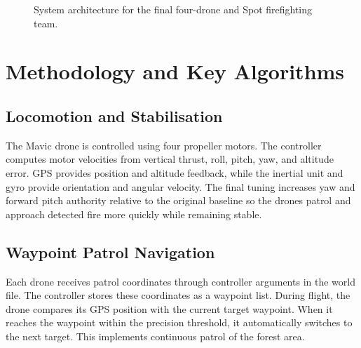 \documentclass[10pt,a4paper]{article}
\begin{document}
\begin{figure}[H]
{
}
\caption{System architecture for the final four-drone and Spot firefighting team.}
\end{figure}

\vspace{-0.6em}

\newpage
\section{Methodology and Key Algorithms}
\subsection{Locomotion and Stabilisation}
The Mavic drone is controlled using four propeller motors. The controller computes motor velocities from vertical thrust, roll, pitch, yaw, and altitude error. GPS provides position and altitude feedback, while the inertial unit and gyro provide orientation and angular velocity. The final tuning increases yaw and forward pitch authority relative to the original baseline so the drones patrol and approach detected fire more quickly while remaining stable.

\subsection{Waypoint Patrol Navigation}
Each drone receives patrol coordinates through controller arguments in the world file. The controller stores these coordinates as a waypoint list. During flight, the drone compares its GPS position with the current target waypoint. When it reaches the waypoint within the precision threshold, it automatically switches to the next target. This implements continuous patrol of the forest area.
\end{document}
